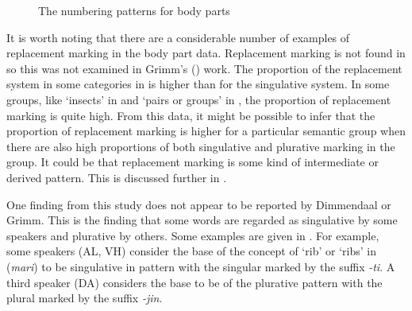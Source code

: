 \documentclass[output=paper]{langsci/langscibook}
\begin{document}
\begin{figure}
\caption{The numbering patterns for body parts}
\label{fig:moodie:2}
\end{figure}

It is worth noting that there are a considerable number of examples of replacement marking in the body part data. Replacement marking is not found in  so this was not examined in Grimm’s (\citeyear{Grimm2012}) work. The proportion of the replacement system in some categories in  is higher than for the singulative system.  In some groups, like ‘insects’ in  and  ‘pairs or groups’ in , the proportion of replacement marking is quite high. From this data, it might be possible to infer that the proportion of replacement marking is higher for a particular semantic group when there are also high proportions of both singulative and plurative marking in the group. It could be that replacement marking is some kind of intermediate or derived pattern.  This is discussed further in .

\newpage 
One finding from this study does not appear to be reported by Dimmendaal or Grimm. This is the finding that some words are regarded as singulative by some speakers and plurative by others. Some examples are given in . For example, some speakers (AL, VH) consider the base of the concept of ‘rib’ or ‘ribs’ in  (\textit{mari}) to be singulative in pattern with the singular marked by the suffix \textit{-ti}. A third speaker (DA) considers the base to be of the plurative pattern with the plural marked by the suffix \textit{-jin}. 
\end{document}
